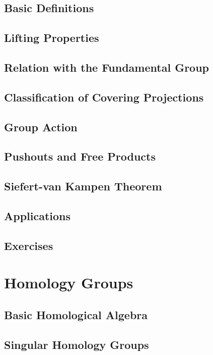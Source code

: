 \subsection{Basic Definitions}

\subsection{Lifting Properties}

\subsection{Relation with the Fundamental Group}

\subsection{Classification of Covering Projections}

\subsection{Group Action}

\subsection{Pushouts and Free Products}

\subsection{Siefert-van Kampen Theorem}

\subsection{Applications}

\subsection{Exercises}

\section{Homology Groups}

\subsection{Basic Homological Algebra}

\subsection{Singular Homology Groups}

